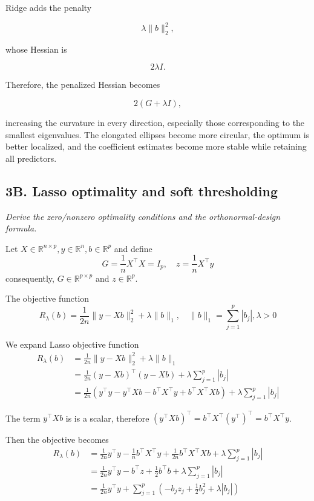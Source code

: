 \documentclass[
  11pt,
]{article}
\begin{document}
Ridge adds the penalty

\[\lambda\|b\|_2^2,\]

whose Hessian is

\[2\lambda I.\]

Therefore, the penalized Hessian becomes

\[2(G+\lambda I),\]

increasing the curvature in every direction, especially those
corresponding to the smallest eigenvalues. The elongated ellipses become
more circular, the optimum is better localized, and the coefficient
estimates become more stable while retaining all predictors.

\subsection{3B. Lasso optimality and soft
thresholding}\label{b.-lasso-optimality-and-soft-thresholding}

\emph{Derive the zero/nonzero optimality conditions and the
orthonormal-design formula.}

Let
\(X \in \mathbb{R}^{n \times p}, y \in \mathbb{R}^n, b \in \mathbb{R}^p\)
and define \[G = \frac{1}{n} X^\top X = I_p, \quad
z = \frac{1}{n} X^\top y\] consequently,
\(G \in \mathbb{R}^{p \times p}\) and \(z \in \mathbb{R}^p\).

The objective function
\[R_\lambda (b) = \frac{1}{2n} \|y - X b\|_2^2 + \lambda \|b\|_1, \quad \|b\|_1 = \sum_{j=1}^p |b_j|, \lambda > 0\]

We expand Lasso objective function \[\begin{aligned}
R_\lambda (b) &= \frac{1}{2n} \|y - X b\|_2^2 + \lambda \|b\|_1 \\
              &= \frac{1}{2n} (y - X b)^\top (y - X b) + \lambda \sum_{j=1}^p |b_j| \\
              &= \frac{1}{2n} (y^\top y - y^\top X b - b^\top X^\top y + b^\top X^\top X b) + \lambda \sum_{j=1}^p |b_j|
\end{aligned}\]

The term \(y^\top X b\) is is a scalar, therefore
\((y^\top X b)^\top = b^\top X^\top (y^\top)^\top = b^\top X^\top y\).

Then the objective becomes \[\begin{aligned}
R_\lambda (b) &= \frac{1}{2n} y^\top y - \frac{1}{n} b^\top X^\top y + \frac{1}{2n} b^\top X^\top X b + \lambda \sum_{j=1}^p |b_j| \\
              &= \frac{1}{2n} y^\top y - b^\top z + \frac{1}{2} b^\top b + \lambda \sum_{j=1}^p |b_j| \\
              &= \frac{1}{2n} y^\top y + \sum_{j=1}^p \left( - b_j z_j + \frac{1}{2} b_j^2 + \lambda |b_j| \right)
\end{aligned}\]
\end{document}
